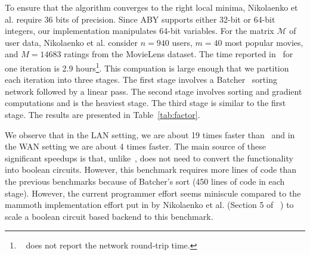 To ensure that the algorithm converges to the right local minima, Nikolaenko et al. require
36 bits of precision. Since ABY supports either 32-bit or 64-bit integers, our \tool implementation
manipulates 64-bit variables. For the matrix $\mathcal{M}$ of  user data, Nikolaenko et al. consider $n=940$ users, $m=40$ most popular movies, and $M=14683$ ratings from the MovieLens dataset. The time reported in~\cite{valeriaMatrix}
for one iteration is 2.9 hours\footnote{~\cite{valeriaMatrix} does not report the network round-trip time.}. This compuation is large enough that we partition each iteration
into three stages. The first stage involves a Batcher~\cite{Batcher} sorting network followed by a linear pass.
The second stage involves sorting and gradient computations and is the heaviest stage.
The third  stage is similar to the first stage. The results are presented in Table~\ref{tab:factor}.



We observe that in the LAN setting, we are about 19 times faster than~\cite{valeriaMatrix} and in the WAN
setting we are about 4 times faster. The main source of these significant speedups is that, unlike~\cite{valeriaMatrix}, \tool does not need to convert the functionality into boolean circuits. 
However, this benchmark requires more lines of code than the previous benchmarks
because of  Batcher's sort (450 lines of \tool code in each stage).
However, the current programmer effort seems miniscule compared to the mammoth implementation effort
put in by Nikolaenko et al. (Section 5 of ~\cite{valeriaMatrix}) to scale a boolean circuit based
backend to this benchmark.


